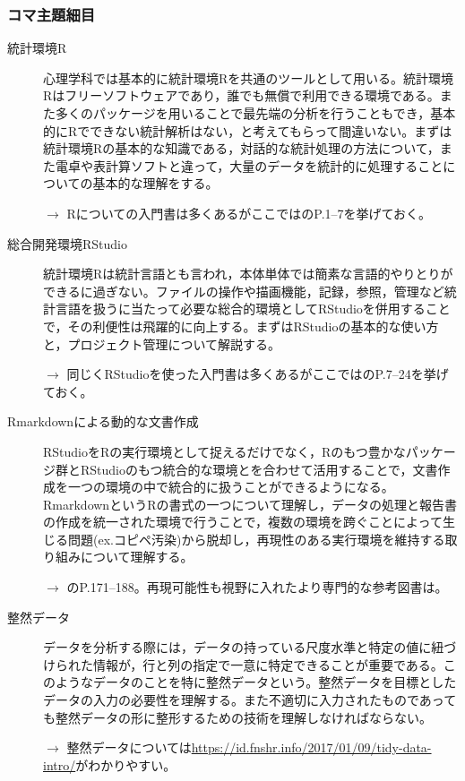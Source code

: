 \subsubsection{コマ主題細目}
\begin{description}
\item[統計環境R] 心理学科では基本的に統計環境Rを共通のツールとして用いる。統計環境Rはフリーソフトウェアであり，誰でも無償で利用できる環境である。また多くのパッケージを用いることで最先端の分析を行うこともでき，基本的にRでできない統計解析はない，と考えてもらって間違いない。まずは統計環境Rの基本的な知識である，対話的な統計処理の方法について，また電卓や表計算ソフトと違って，大量のデータを統計的に処理することについての基本的な理解をする。
\begin{flushright}
    $\to$ Rについての入門書は多くあるがここでは\citet{kosugi2019}のP.1--7を挙げておく。
\end{flushright}
\item[総合開発環境RStudio]統計環境Rは統計言語とも言われ，本体単体では簡素な言語的やりとりができるに過ぎない。ファイルの操作や描画機能，記録，参照，管理など統計言語を扱うに当たって必要な総合的環境としてRStudioを併用することで，その利便性は飛躍的に向上する。まずはRStudioの基本的な使い方と，プロジェクト管理について解説する。
\begin{flushright}
    $\to$ 同じくRStudioを使った入門書は多くあるがここでは\citet{kosugi2019}のP.7--24を挙げておく。
\end{flushright}

\item[Rmarkdownによる動的な文書作成]RStudioをRの実行環境として捉えるだけでなく，Rのもつ豊かなパッケージ群とRStudioのもつ統合的な環境とを合わせて活用することで，文書作成を一つの環境の中で統合的に扱うことができるようになる。RmarkdownというRの書式の一つについて理解し，データの処理と報告書の作成を統一された環境で行うことで，複数の環境を跨ぐことによって生じる問題(ex.コピペ汚染)から脱却し，再現性のある実行環境を維持する取り組みについて理解する。
\begin{flushright}
    $\to$ \citet{kosugi2019}のP.171--188。再現可能性も視野に入れたより専門的な参考図書は\citet{高橋201805}。
\end{flushright}

\item[整然データ]データを分析する際には，データの持っている尺度水準と特定の値に紐づけられた情報が，行と列の指定で一意に特定できることが重要である。このようなデータのことを特に整然データという。整然データを目標としたデータの入力の必要性を理解する。また不適切に入力されたものであっても整然データの形に整形するための技術を理解しなければならない。
\begin{flushright}
    $\to$ 整然データについては\url{https://id.fnshr.info/2017/01/09/tidy-data-intro/}がわかりやすい。
\end{flushright}


\end{description}
